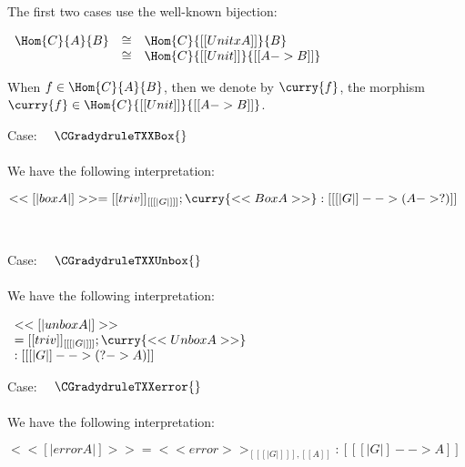   The first two cases use the well-known bijection:  
  \begin{center}
    \begin{math}
      \begin{array}{lll}
        \Hom{C}{A}{B} & \cong & \Hom{C}{[[Unit x A]]}{B}\\
                      & \cong & \Hom{C}{[[Unit]]}{[[A -> B]]}
      \end{array}
    \end{math}
  \end{center}
  When $f \in \Hom{C}{A}{B}$, then we denote by $\curry{f}$, the
  morphism $\curry{f} \in \Hom{C}{[[Unit]]}{[[A -> B]]}$.
\begin{description}
\item Case: $\quad \CGradydruleTXXBox{}$\\
  \\
  \noindent
  We have the following interpretation:
  \begin{center}
    \begin{math}
      << [| box A |] >> = [[triv]]_{[[ [| G |] ]]};\curry{<<Box A>>} : [[ [| G |] --> (A -> ?) ]]
    \end{math}
  \end{center}
  \ \\
\item Case: $\quad \CGradydruleTXXUnbox{}$\\
  \\
  \noindent
  We have the following interpretation:
  \begin{center}
    \begin{math}
      \begin{array}{lll}
        << [| unbox A |] >> \\
        = [[triv]]_{[[ [| G |] ]]};\curry{<<Unbox A>>}\\
        : [[ [| G |] --> (? -> A)]]
      \end{array}
    \end{math}
  \end{center}

\item Case: $\quad \CGradydruleTXXerror{}$\\
  \\
  \noindent
  We have the following interpretation:
  \begin{center}
    \begin{math}
      << [| error A |] >> = <<error>>_{[[ [| G |] ]],[[A]]} : [[ [| G |] --> A]]
    \end{math}
  \end{center}
\end{description}


